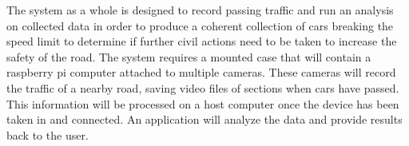 The system as a whole is designed to record passing traffic and run an analysis on collected data in order to produce a coherent collection of cars breaking the speed limit to determine if further civil actions need to be taken to increase the safety of the road.  The system requires a mounted case that will contain a raspberry pi computer attached to multiple cameras.  These cameras will record the traffic of a nearby road, saving video files of sections when cars have passed.  This information will be processed on a host computer once the device has been taken in and connected.  An application will analyze the data and provide results back to the user.